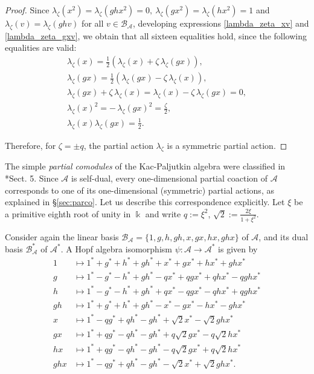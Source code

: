 \documentclass[reqno]{amsart}
\theoremstyle{definition}
\numberwithin{equation}{section}\theoremstyle{plain}
\newcommand{\B}{\mathcal{B}}
\theoremstyle{definition}
\def \A {\mathcal{A}}
\begin{document}
\begin{proof}
Since $\lambda_\zeta(x^2)= \lambda_\zeta(ghx^2)=0,\ \lambda_\zeta(gx^2)= \lambda_\zeta(hx^2)= 1$ and $\lambda_\zeta(v)=\lambda_\zeta(ghv)$ for all $v \in \B_\A$, developing expressions \eqref{lambda_zeta_xv} and \eqref{lambda_zeta_gxv}, we obtain that all sixteen equalities hold, since the following equalities are valid:
\begin{gather*}
\lambda_\zeta(x) = \tfrac{1}{2} \left( \lambda_\zeta (x) + \zeta \, \lambda_\zeta(gx) \right), \\
\lambda_\zeta(gx) = \tfrac{1}{2} \left( \lambda_\zeta (gx) - \zeta \, \lambda_\zeta(x) \right), \\
\lambda_\zeta (gx) + \zeta \, \lambda_\zeta(x)  =  \lambda_\zeta (x) - \zeta \, \lambda_\zeta(gx) = 0, \\
    \lambda_\zeta (x)^2 = - \, \lambda_\zeta (gx)^2 = \tfrac{\zeta}{2}, \\
    \lambda_\zeta (x) \lambda_\zeta(gx) = \tfrac{1}{2}.
\end{gather*}

Therefore, for $\zeta = \pm q$, the partial action $\lambda_\zeta$ is a symmetric partial action.
\end{proof}

\medbreak

The simple \textit{partial comodules} of the Kac-Paljutkin algebra were classified in \cite{BHSV}*{Sect. 5}.
    Since \(\A\) is self-dual, every one-dimensional partial coaction of \(\A\) corresponds to one of its one-dimensional (symmetric) partial actions, as explained in \S \ref{sec:parco}.
    Let us describe this correspondence explicitly. Let \(\xi\) be a primitive eighth root of unity in \(\Bbbk\) and write \(q := \xi^2\), \(\sqrt{2} := \frac{2\xi}{1 + \xi^2}\).

    Consider again the linear basis \(\B_\A = \{1, g, h, gh, x, gx, hx, ghx\}\) of \(\A\), and its dual basis \(\B_\A^*\) of \(\A^*\). A Hopf algebra isomorphism \(\psi : \A \to \A^*\) is given by
    \begin{align*}
	1 &\mapsto 1^* + g^* + h^* + gh^* + x^* + gx^* + hx^* + ghx^* \\
	g &\mapsto 1^* - g^* - h^* + gh^* - q x^* +q gx^* + qhx^* -q ghx^* \\
	h &\mapsto 1^* - g^* - h^* + gh^* + qx^* -q gx^* -q hx^* + qghx^* \\
	gh &\mapsto 1^* + g^* + h^* + gh^* - x^* - gx^* - hx^* - ghx^* \\
	x &\mapsto 1^* - qg^* +q h^* - gh^* + \sqrt{2} x^* - \sqrt{2} ghx^* \\
	gx &\mapsto 1^* + q g^* - qh^* - gh^*  + q \sqrt{2} gx^* -q \sqrt{2} hx^*  \\
	hx &\mapsto 1^* +q g^* -q h^* - gh^* -q \sqrt{2} gx^* + q \sqrt{2} hx^* \\
	ghx &\mapsto 1^* - qg^* +q h^* - gh^* - \sqrt{2} x^* + \sqrt{2} ghx^*.
\end{align*}
\end{document}
